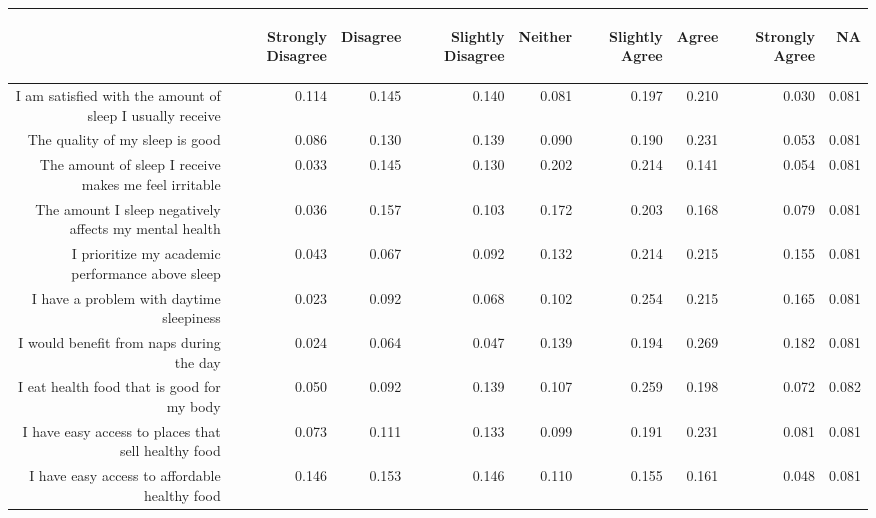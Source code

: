 \documentclass{article}\usepackage[]{graphicx}\usepackage[]{color}
\makeatletter
\newenvironment{kframe}{%
 \def\at@end@of@kframe{}%
 \ifinner\ifhmode%
  \def\at@end@of@kframe{\end{minipage}}%
  \begin{minipage}{\columnwidth}%
 \fi\fi%
 \def\FrameCommand##1{\hskip\@totalleftmargin \hskip-\fboxsep
 \colorbox{shadecolor}{##1}\hskip-\fboxsep
     \hskip-\linewidth \hskip-\@totalleftmargin \hskip\columnwidth}%
 \MakeFramed {\advance\hsize-\width
   \@totalleftmargin\z@ \linewidth\hsize
   \@setminipage}}%
 {\par\unskip\endMakeFramed%
 \at@end@of@kframe}
\makeatother
\begin{document}
\begin{table}[ht]
\centering
\begin{tabular}{rrrrrrrrr}
  \hline
 & \begin{sideways} Strongly Disagree \end{sideways} & \begin{sideways} Disagree \end{sideways} & \begin{sideways} Slightly Disagree \end{sideways} & \begin{sideways} Neither \end{sideways} & \begin{sideways} Slightly Agree \end{sideways} & \begin{sideways} Agree \end{sideways} & \begin{sideways} Strongly Agree \end{sideways} & \begin{sideways} NA \end{sideways} \\ 
  \hline
I am satisfied with the amount of sleep I usually receive & 0.114 & 0.145 & 0.140 & 0.081 & 0.197 & 0.210 & 0.030 & 0.081 \\ 
  The quality of my sleep is good & 0.086 & 0.130 & 0.139 & 0.090 & 0.190 & 0.231 & 0.053 & 0.081 \\ 
  The amount of sleep I receive makes me feel irritable & 0.033 & 0.145 & 0.130 & 0.202 & 0.214 & 0.141 & 0.054 & 0.081 \\ 
  The amount I sleep negatively affects my mental health & 0.036 & 0.157 & 0.103 & 0.172 & 0.203 & 0.168 & 0.079 & 0.081 \\ 
  I prioritize my academic performance above sleep & 0.043 & 0.067 & 0.092 & 0.132 & 0.214 & 0.215 & 0.155 & 0.081 \\ 
  I have a problem with daytime sleepiness & 0.023 & 0.092 & 0.068 & 0.102 & 0.254 & 0.215 & 0.165 & 0.081 \\ 
  I would benefit from naps during the day & 0.024 & 0.064 & 0.047 & 0.139 & 0.194 & 0.269 & 0.182 & 0.081 \\ 
  I eat health food that is good for my body & 0.050 & 0.092 & 0.139 & 0.107 & 0.259 & 0.198 & 0.072 & 0.082 \\ 
  I have easy access to places that sell healthy food & 0.073 & 0.111 & 0.133 & 0.099 & 0.191 & 0.231 & 0.081 & 0.081 \\ 
  I have easy access to affordable healthy food & 0.146 & 0.153 & 0.146 & 0.110 & 0.155 & 0.161 & 0.048 & 0.081 \\ 
   \hline
\end{tabular}
\end{table}
\begin{kframe}

{\ttfamily\noindent\bfseries{}}\end{kframe}
\end{document}
